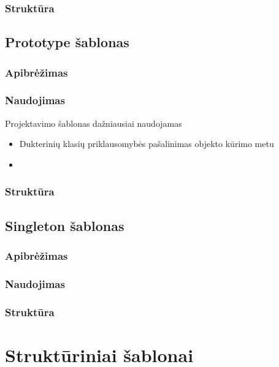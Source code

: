 \documentclass[10pt]{IEEEtran}
\begin{document}
			\subsubsection{Struktūra}

		\subsection{Prototype šablonas}



			\subsubsection{Apibrėžimas}

			\subsubsection{Naudojimas}

				Projektavimo šablonas dažniausiai naudojamas

				\begin{itemize}
					\item Dukterinių klasių priklausomybės pašalinimas objekto kūrimo metu
					\item 
				\end{itemize}

			\subsubsection{Struktūra}

		\subsection{Singleton šablonas}

			\subsubsection{Apibrėžimas}

			\subsubsection{Naudojimas}

			\subsubsection{Struktūra}

	\section{Struktūriniai šablonai}
\end{document}
